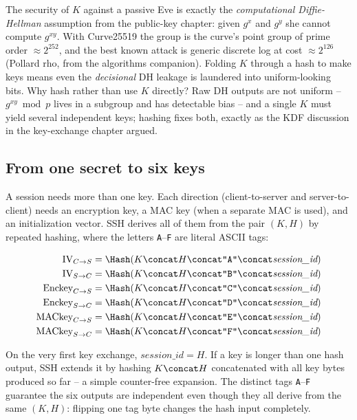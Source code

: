 \begin{connectionbox}
The security of $K$ against a passive Eve is exactly the \emph{computational Diffie-Hellman} assumption from the public-key chapter: given $g^{x}$ and $g^{y}$ she cannot compute $g^{xy}$. With Curve25519 the group is the curve's point group of prime order $\approx 2^{252}$, and the best known attack is generic discrete log at cost $\approx 2^{126}$ (Pollard rho, from the algorithms companion). Folding $K$ through a hash to make keys means even the \emph{decisional} DH leakage is laundered into uniform-looking bits. Why hash rather than use $K$ directly? Raw DH outputs are not uniform -- $g^{xy} \bmod p$ lives in a subgroup and has detectable bias -- and a single $K$ must yield several independent keys; hashing fixes both, exactly as the KDF discussion in the key-exchange chapter argued.
\end{connectionbox}

\subsection{From one secret to six keys}

A session needs more than one key. Each direction (client-to-server and server-to-client) needs an encryption key, a MAC key (when a separate MAC is used), and an initialization vector. SSH derives all of them from the pair $(K, H)$ by repeated hashing, where the letters \texttt{A}--\texttt{F} are literal ASCII tags:

\[
\begin{aligned}
\text{IV}_{C \to S}     &= \Hash(K \concat H \concat \texttt{"A"} \concat \textit{session\_id}) \\
\text{IV}_{S \to C}     &= \Hash(K \concat H \concat \texttt{"B"} \concat \textit{session\_id}) \\
\text{Enckey}_{C \to S} &= \Hash(K \concat H \concat \texttt{"C"} \concat \textit{session\_id}) \\
\text{Enckey}_{S \to C} &= \Hash(K \concat H \concat \texttt{"D"} \concat \textit{session\_id}) \\
\text{MACkey}_{C \to S} &= \Hash(K \concat H \concat \texttt{"E"} \concat \textit{session\_id}) \\
\text{MACkey}_{S \to C} &= \Hash(K \concat H \concat \texttt{"F"} \concat \textit{session\_id})
\end{aligned}
\]

On the very first key exchange, $\textit{session\_id} = H$. If a key is longer than one hash output, SSH extends it by hashing $K \concat H$ concatenated with all key bytes produced so far -- a simple counter-free expansion. The distinct tags \texttt{A}--\texttt{F} guarantee the six outputs are independent even though they all derive from the same $(K,H)$: flipping one tag byte changes the hash input completely.

